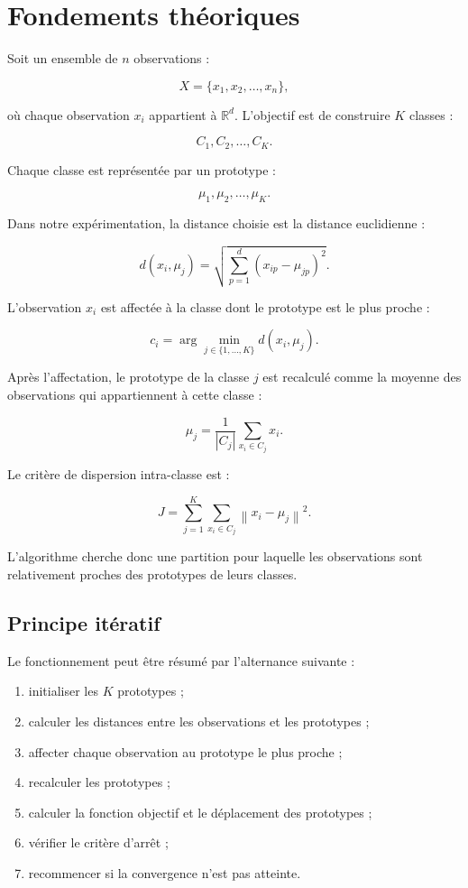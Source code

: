 \documentclass[12pt,a4paper]{article}
\begin{document}
\section{Fondements théoriques}

Soit un ensemble de $n$ observations :

\[
X=\{x_1,x_2,\ldots,x_n\},
\]

où chaque observation $x_i$ appartient à $\mathbb{R}^d$. L'objectif est de construire $K$ classes :

\[
C_1,C_2,\ldots,C_K.
\]

Chaque classe est représentée par un prototype :

\[
\mu_1,\mu_2,\ldots,\mu_K.
\]

Dans notre expérimentation, la distance choisie est la distance euclidienne :

\[
d(x_i,\mu_j)=
\sqrt{\sum_{p=1}^{d}(x_{ip}-\mu_{jp})^2}.
\]

L'observation $x_i$ est affectée à la classe dont le prototype est le plus proche :

\[
c_i=\arg\min_{j\in\{1,\ldots,K\}}d(x_i,\mu_j).
\]

Après l'affectation, le prototype de la classe $j$ est recalculé comme la moyenne des observations qui appartiennent à cette classe :

\[
\mu_j=
\frac{1}{|C_j|}
\sum_{x_i\in C_j}x_i.
\]

Le critère de dispersion intra-classe est :

\[
J=
\sum_{j=1}^{K}
\sum_{x_i\in C_j}
\left\|x_i-\mu_j\right\|^2.
\]

L'algorithme cherche donc une partition pour laquelle les observations sont relativement proches des prototypes de leurs classes.

\subsection{Principe itératif}

Le fonctionnement peut être résumé par l'alternance suivante :

\begin{enumerate}
    \item initialiser les $K$ prototypes ;
    \item calculer les distances entre les observations et les prototypes ;
    \item affecter chaque observation au prototype le plus proche ;
    \item recalculer les prototypes ;
    \item calculer la fonction objectif et le déplacement des prototypes ;
    \item vérifier le critère d'arrêt ;
    \item recommencer si la convergence n'est pas atteinte.
\end{enumerate}
\end{document}
